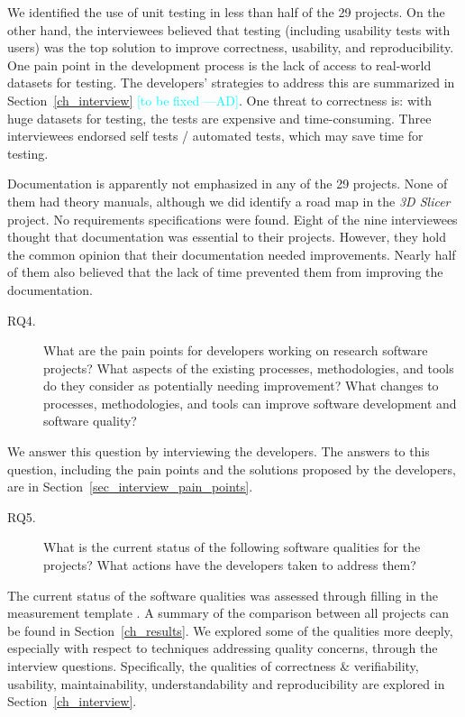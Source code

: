 \documentclass[final, 3p, times, authoryear]{elsarticle}
\newcommand{\authornote}[3]{\textcolor{#1}{[#3 ---#2]}}
\newcommand{\authornote}[3]{}
\newcommand{\ad}[1]{\authornote{cyan}{AD}{#1}} %
\begin{document}
We identified the use of unit testing in less than half of the 29 projects. On
the other hand, the interviewees believed that testing (including usability
tests with users) was the top solution to improve correctness, usability, and
reproducibility. One pain point in the development process is the lack of access
to real-world datasets for testing. The developers' strategies to address this
are summarized in Section~\ref{ch_interview} \ad{to be fixed}. One threat to correctness is:
with huge datasets for testing, the tests are expensive and time-consuming.
Three interviewees endorsed self tests / automated tests, which may save time
for testing.

Documentation is apparently not emphasized in any of the 29 projects.  None of
them had theory manuals, although we did identify a road map in the \textit{3D
Slicer} project.  No requirements specifications were found. Eight of the nine
interviewees thought that documentation was essential to their projects.
However, they hold the common opinion that their documentation needed
improvements. Nearly half of them also believed that the lack of time prevented
them from improving the documentation.

\begin{description}
\item[RQ4.] What are the pain points for developers working on research software
projects? What aspects of the existing processes, methodologies, and tools do
they consider as potentially needing improvement? What changes to processes,
methodologies, and tools can improve software development and software quality?
\end{description}

We answer this question by interviewing the developers. The answers to this
question, including the pain points and the solutions proposed by the
developers, are in Section~\ref{sec_interview_pain_points}.

\begin{description}
\item[RQ5.] What is the current status of the following
software qualities for the projects? What actions have the developers taken to
address them?
\end{description}

The current status of the software qualities was assessed through filling in the
measurement template \citep{Dong2021-Data}.  A summary of the comparison between
all projects can be found in Section~\ref{ch_results}.  We explored some of the
qualities more deeply, especially with respect to techniques addressing quality
concerns, through the interview questions.  Specifically, the qualities of
correctness \& verifiability, usability, maintainability, understandability and
reproducibility are explored in Section~\ref{ch_interview}.
\end{document}
